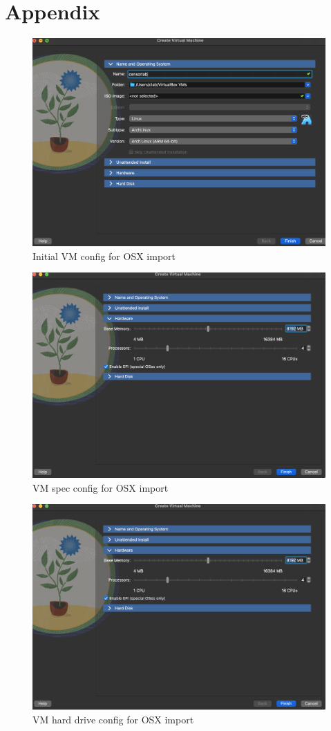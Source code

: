 \documentclass[12pt]{article}
\begin{document}
\section{Appendix}
\begin{figure}[h]
    \centering
    \includegraphics[width=\linewidth]{vm_config1.png}
    \caption{Initial VM config for OSX import}
    \label{fig:osx-initial}
\end{figure}
\begin{figure}[h]
    \centering
    \includegraphics[width=\linewidth]{vm_config2.png}
    \caption{VM spec config for OSX import}
    \label{fig:osx-spec}
\end{figure}
\begin{figure}[h]
    \centering
    \includegraphics[width=\linewidth]{vm_config2.png}
    \caption{VM hard drive config for OSX import}
    \label{fig:osx-hdd}
\end{figure}
\end{document}
